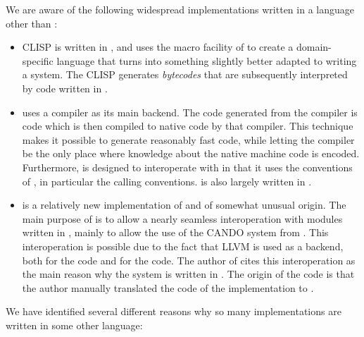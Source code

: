 We are aware of the following widespread implementations written in a
language other than \commonlisp{}:

\begin{itemize}
\item CLISP is written in \clanguage{}, and uses the macro facility of
  \clanguage{} to create a domain-specific language that turns
  \clanguage{} into something slightly better adapted to writing a
  \commonlisp{} system.  The CLISP generates \emph{bytecodes} that are
  subsequently interpreted by code written in \clanguage{}.
\item \ecl{} uses a \clanguage{} compiler as its main backend.  The
  code generated from the \ecl{} compiler is \clanguage{} code which
  is then compiled to native code by that \clanguage{} compiler.  This
  technique makes it possible to generate reasonably fast code, while
  letting the \clanguage{} compiler be the only place where knowledge
  about the native machine code is encoded.  Furthermore, \ecl{} is
  designed to interoperate with \clanguage{} in that it uses the
  conventions of \clanguage{}, in particular the \clanguage{} calling
  conventions.  \ecl{} is also largely written in \clanguage{}.
\item \clasp{} is a relatively new implementation of \commonlisp{} and
  of somewhat unusual origin.  The main purpose of \clasp{} is to
  allow a nearly seamless interoperation with modules written in
  \cplusplus{}, mainly to allow the use of the CANDO system from
  \commonlisp{}.  This interoperation is possible due to the fact that
  LLVM is used as a backend, both for the \cplusplus{} code and for
  the \commonlisp{} code.  The author of \clasp{} cites this
  interoperation as the main reason why the system is written in
  \cplusplus{}.  The origin of the \cplusplus{} code is that the
  author manually translated the \clanguage{} code of the \ecl{}
  \commonlisp{} implementation to \cplusplus{}.
\end{itemize}

We have identified several different reasons why so many \commonlisp{}
implementations are written in some other language:


